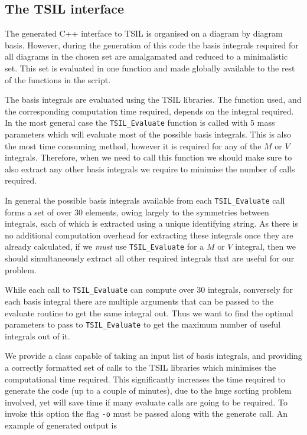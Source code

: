 \subsection{The TSIL interface}\label{sec:tsil_interface}

The generated C++ interface to TSIL is organised on a diagram by diagram basis.  However, during the generation of this code the basis integrals required for all diagrams in the chosen set are amalgamated and reduced to a minimalistic set.  This set is evaluated in one function and made globally available to the rest of the functions in the script.

The basis integrals are evaluated using the TSIL libraries.  The function used, and the corresponding computation time required, depends on the integral required.  In the most general case the \lstinline{TSIL_Evaluate} function is called with 5 mass parameters which will evaluate most of the possible basis integrals.  This is also the most time consuming method, however it is required for any of the $M$ or $V$ integrals.  Therefore, when we need to call this function we should make sure to also extract any other basis integrals we require to minimise the number of calls required.

In general the possible basis integrals available from each \lstinline{TSIL_Evaluate} call forms a set of over 30 elements, owing largely to the symmetries between integrals, each of which is extracted using a unique identifying string.  As there is no additional computation overhead for extracting these integrals once they are already calculated, if we \textit{must} use \lstinline{TSIL_Evaluate} for a $M$ or $V$ integral, then we should simultaneously extract all other required integrals that are useful for our problem.

While each call to \lstinline{TSIL_Evaluate} can compute over 30 integrals, conversely for each basis integral there are multiple arguments that can be passed to the evaluate routine to get the same integral out.  Thus we want to find the optimal parameters to pass to  \lstinline{TSIL_Evaluate} to get the maximum number of useful integrals out of it.

We provide a class capable of taking an input list of basis integrals, and providing a correctly formatted set of calls to the TSIL libraries which minimises the computational time required.  This significantly increases the time required to generate the code (up to a couple of minutes), due to the huge sorting problem involved, yet will save time if many evaluate calls are going to be required.  To invoke this option the flag \lstinline{-o} must be passed along with the generate call.  An example of generated output is

